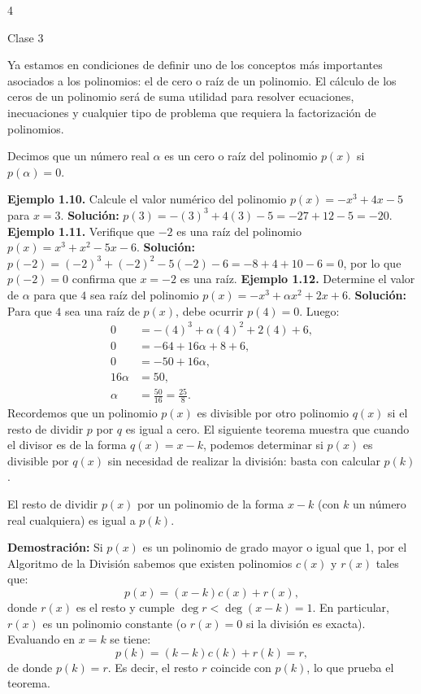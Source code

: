 \documentclass[landscape]{article}
\begin{document}
\begin{landscape}
\begin{multicols}{4}

Clase 3

Ya estamos en condiciones de definir uno de los conceptos más importantes asociados a los polinomios: el de cero o raíz de un polinomio. El cálculo de los ceros de un polinomio será de suma utilidad para resolver ecuaciones, inecuaciones y cualquier tipo de problema que requiera la factorización de polinomios.
\begin{tcolorbox}[colback=blue!5!white,colframe=blue!75!black,title=\textbf{Definición (Cero o raíz de un polinomio)}]
Decimos que un número real $\alpha$ es un cero o raíz del polinomio $p(x)$ si $p(\alpha) = 0$.
\end{tcolorbox}
\noindent\textbf{Ejemplo 1.10.} Calcule el valor numérico del polinomio $p(x) = -x^3 + 4x - 5$ para $x = 3$.
\noindent\textbf{Solución:}
$p(3) = -(3)^3 + 4(3) - 5 = -27 + 12 - 5 = -20$.
\noindent\textbf{Ejemplo 1.11.} Verifique que $-2$ es una raíz del polinomio $p(x) = x^3 + x^2 - 5x - 6$.
\noindent\textbf{Solución:}
$p(-2) = (-2)^3 + (-2)^2 - 5(-2) - 6 = -8 + 4 + 10 - 6 = 0$,
por lo que $p(-2)=0$ confirma que $x=-2$ es una raíz.
\noindent\textbf{Ejemplo 1.12.} Determine el valor de $\alpha$ para que $4$ sea raíz del polinomio $p(x) = -x^3 + \alpha x^2 + 2x + 6$.
\noindent\textbf{Solución:} Para que $4$ sea una raíz de $p(x)$, debe ocurrir $p(4) = 0$. Luego:
\begin{align*}
0 &= -(4)^3 + \alpha (4)^2 + 2(4) + 6,\\
0 &= -64 + 16\alpha + 8 + 6,\\
0 &= -50 + 16\alpha,\\
16\alpha &= 50,\\
\alpha &= \frac{50}{16} = \frac{25}{8}.
\end{align*}
Recordemos que un polinomio $p(x)$ es divisible por otro polinomio $q(x)$ si el resto de dividir $p$ por $q$ es igual a cero. El siguiente teorema muestra que cuando el divisor es de la forma $q(x) = x - k$, podemos determinar si $p(x)$ es divisible por $q(x)$ sin necesidad de realizar la división: basta con calcular $p(k)$.
\begin{tcolorbox}[colback=red!5!white,colframe=red!75!black,title=\textbf{Teorema del resto}]
El resto de dividir $p(x)$ por un polinomio de la forma $x - k$ (con $k$ un número real cualquiera) es igual a $p(k)$.

\medskip\noindent\textbf{Demostración:}
Si $p(x)$ es un polinomio de grado mayor o igual que 1, por el Algoritmo de la División sabemos que existen polinomios $c(x)$ y $r(x)$ tales que:
\[p(x) = (x - k)c(x) + r(x),\]
donde $r(x)$ es el resto y cumple $\deg r < \deg(x - k) = 1$. En particular, $r(x)$ es un polinomio constante (o $r(x)=0$ si la división es exacta). Evaluando en $x = k$ se tiene:
\[p(k) = (k - k)c(k) + r(k) = r,\]
de donde $p(k) = r$. Es decir, el resto $r$ coincide con $p(k)$, lo que prueba el teorema.
\end{tcolorbox}


\end{multicols}
\end{landscape}
\end{document}

